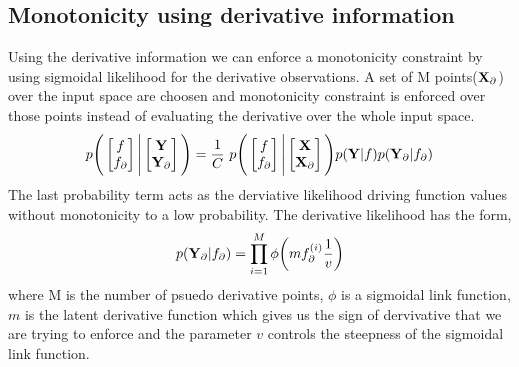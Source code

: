 \subsection{Monotonicity using derivative information}
Using the derivative information we can enforce a monotonicity constraint by using sigmoidal likelihood for the derivative observations. A set of M points($\mathbf{X}_{\partial}$) over the input space are choosen and monotonicity constraint is enforced over those points instead of evaluating the derivative over the whole input space. 
\begin{align}
p\Bigg(\begin{bmatrix} f \\ f_{\partial} \end{bmatrix} \Bigg| \begin{bmatrix} \mathbf{Y} \\ \mathbf{Y}_{\partial}\end{bmatrix} \Bigg) = 
\frac{1}{C}\ p\Bigg(\begin{bmatrix} f \\ f_{\partial}\end{bmatrix} \Bigg| \begin{bmatrix} \mathbf{X} \\ \mathbf{X}_{\partial}\end{bmatrix} \Bigg) p(\mathbf{Y}|f)p(\mathbf{Y}_{\partial}|f_{\partial}) \label{jointdens}
\end{align}
The last probability term acts as the derviative likelihood driving function values without monotonicity to a low probability. The derivative likelihood has the form,
\begin{align}
p(\mathbf{Y}_{\partial}|f_{\partial}) = \prod_{i=1}^{M}\phi\bigg(m f_{\partial}^{(i)} \frac{1}{v}\bigg) \label{linkfunc}
\end{align}
where M is the number of psuedo derivative points, $\phi$ is a sigmoidal link function, $m$ is the latent derivative function which gives us the sign of dervivative that we are trying to enforce and the parameter $v$ controls the steepness of the sigmoidal link function.

